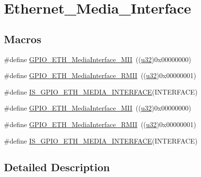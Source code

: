 \hypertarget{group___ethernet___media___interface}{}\section{Ethernet\+\_\+\+Media\+\_\+\+Interface}
\label{group___ethernet___media___interface}
\subsection*{Macros}
\begin{DoxyCompactItemize}
\item 
\#define \hyperlink{group___ethernet___media___interface_gae11ff25c61c4f22f55118f9f88f6d465}{G\+P\+I\+O\+\_\+\+E\+T\+H\+\_\+\+Media\+Interface\+\_\+\+M\+II}~((\hyperlink{agilefox_2library_2inc_2stm32f10x__type_8h_a2caf5cd7bcdbe1eefa727f44ffb10bac}{u32})0x00000000)
\item 
\#define \hyperlink{group___ethernet___media___interface_ga5ee3d057ee58149b1d1abdacfacd4a4e}{G\+P\+I\+O\+\_\+\+E\+T\+H\+\_\+\+Media\+Interface\+\_\+\+R\+M\+II}~((\hyperlink{agilefox_2library_2inc_2stm32f10x__type_8h_a2caf5cd7bcdbe1eefa727f44ffb10bac}{u32})0x00000001)
\item 
\#define \hyperlink{group___ethernet___media___interface_gaaba662c046aed61cb28aa10918bfd4c4}{I\+S\+\_\+\+G\+P\+I\+O\+\_\+\+E\+T\+H\+\_\+\+M\+E\+D\+I\+A\+\_\+\+I\+N\+T\+E\+R\+F\+A\+CE}(I\+N\+T\+E\+R\+F\+A\+CE)
\item 
\#define \hyperlink{group___ethernet___media___interface_gae11ff25c61c4f22f55118f9f88f6d465}{G\+P\+I\+O\+\_\+\+E\+T\+H\+\_\+\+Media\+Interface\+\_\+\+M\+II}~((\hyperlink{agilefox_2library_2inc_2stm32f10x__type_8h_a2caf5cd7bcdbe1eefa727f44ffb10bac}{u32})0x00000000)
\item 
\#define \hyperlink{group___ethernet___media___interface_ga5ee3d057ee58149b1d1abdacfacd4a4e}{G\+P\+I\+O\+\_\+\+E\+T\+H\+\_\+\+Media\+Interface\+\_\+\+R\+M\+II}~((\hyperlink{agilefox_2library_2inc_2stm32f10x__type_8h_a2caf5cd7bcdbe1eefa727f44ffb10bac}{u32})0x00000001)
\item 
\#define \hyperlink{group___ethernet___media___interface_gaaba662c046aed61cb28aa10918bfd4c4}{I\+S\+\_\+\+G\+P\+I\+O\+\_\+\+E\+T\+H\+\_\+\+M\+E\+D\+I\+A\+\_\+\+I\+N\+T\+E\+R\+F\+A\+CE}(I\+N\+T\+E\+R\+F\+A\+CE)
\end{DoxyCompactItemize}


\subsection{Detailed Description}


